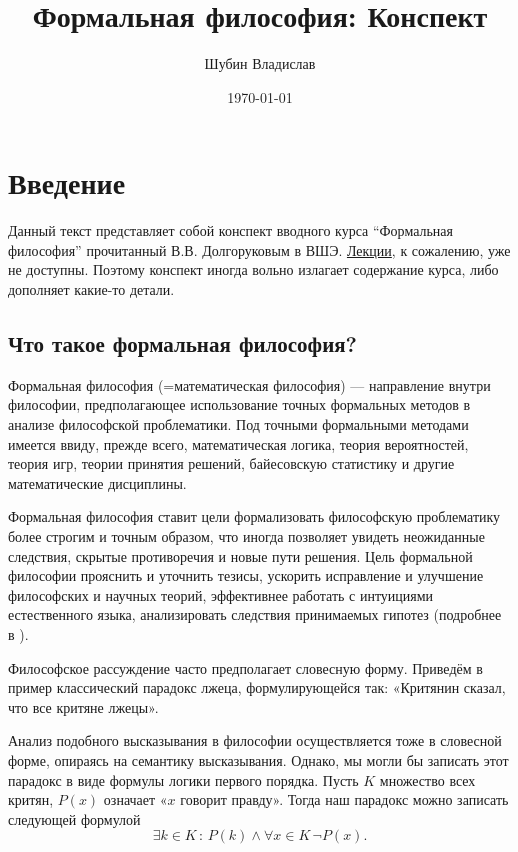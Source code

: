 \documentclass[openany]{book}
\date{\today}
\author{Шубин Владислав}
\title{Формальная философия: Конспект}
\theoremstyle{plain}
\theoremstyle{definition}
\begin{document}
\maketitle
\tableofcontents

\chapter{Введение}

Данный текст представляет собой конспект вводного курса ``Формальная философия'' прочитанный В.В. Долгоруковым в ВШЭ. \href{https://drive.google.com/drive/folders/14R_Xut-3dRLUAvHlE7vkMyW9hsI8oiwV}{Лекции}, к сожалению, уже не доступны. Поэтому конспект иногда вольно излагает содержание курса, либо дополняет какие-то детали.

\section{Что такое формальная философия?}

Формальная философия (=математическая философия) — направление внутри философии, предполагающее использование точных формальных методов в анализе философской проблематики. Под точными формальными методами имеется ввиду, прежде всего, математическая логика, теория вероятностей, теория игр, теории принятия решений, байесовскую статистику и другие математические дисциплины.

Формальная философия ставит цели формализовать философскую проблематику более строгим и точным образом, что иногда позволяет увидеть неожиданные следствия, скрытые противоречия и новые пути решения. Цель формальной философии прояснить и уточнить тезисы, ускорить исправление и улучшение философских и научных теорий, эффективнее работать с интуициями естественного языка, анализировать следствия принимаемых гипотез (подробнее в \cite{Dolgorukov}).

Философское рассуждение часто предполагает словесную форму. Приведём в пример классический парадокс лжеца, формулирующейся так:
«Критянин сказал, что все критяне лжецы».

Анализ подобного высказывания в философии осуществляется тоже в словесной форме, опираясь на семантику высказывания. Однако, мы могли бы записать этот парадокс в виде формулы логики первого порядка. Пусть \(K\) множество всех критян, \(P(x)\) означает «\(x\) говорит правду». Тогда наш парадокс можно записать следующей формулой \[\exists k \in K \, : \, P(k) \land \forall x \in K \, \neg P(x).\]
\end{document}

